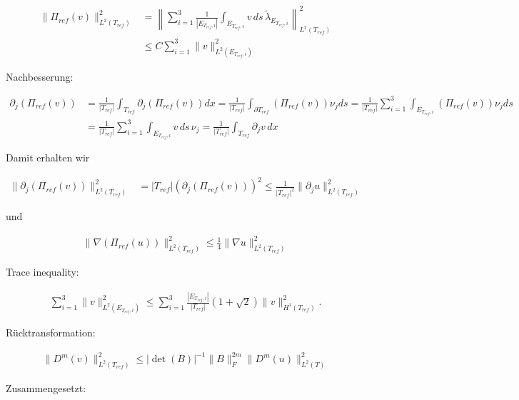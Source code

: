\begin{solution}
\begin{enumerate}[label = \textbf{\alph*)}]
  \begin{align*}
    \|\Pi_{ref}(v)\|_{L^2(T_{ref})}^2 &=
    \left\|\sum_{i=1}^{3} \frac{1}{|E_{T_{ref},i}|}\int_{E_{T_{ref},i}} v\, ds\,
    \tilde{\lambda}_{E_{T_{ref},i}} \right\|_{L^2(T_{ref})}^2 \\
    &\leq C \sum_{i=1}^{3}\|v\|_{L^2(E_{T_{ref},i})}^2
  \end{align*}

  Nachbesserung:

  \begin{align*}
    \partial_j (\Pi_{ref}(v)) &= \frac{1}{|T_{ref}|}\int_{T_{ref}} \partial_j (\Pi_{ref}(v)) dx
    = \frac{1}{|T_{ref}|}\int_{\partial T_{ref}} (\Pi_{ref}(v)) \nu_j ds
    = \frac{1}{|T_{ref}|}\sum_{i=1}^3\int_{E_{T_{ref},i}} (\Pi_{ref}(v)) \nu_j ds \\
    &= \frac{1}{|T_{ref}|}\sum_{i=1}^3\int_{E_{T_{ref},i}} v\, ds\, \nu_j
    = \frac{1}{|T_{ref}|}\int_{T_{ref}} \partial_j v\, dx
  \end{align*}

  Damit erhalten wir

  \begin{align*}
    \|\partial_j (\Pi_{ref}(v))\|_{L^2(T_{ref})}^2 &= |T_{ref}| (\partial_j (\Pi_{ref}(v)))^2
    \leq \frac{1}{|T_{ref}|^2} \|\partial_j u\|_{L^2(T_{ref})}^2
  \end{align*}

  und

  \begin{align*}
    \|\nabla(\Pi_{ref}(u))\|_{L^2(T_{ref})}^2 \leq \frac{1}{4} \|\nabla u\|_{L^2(T_{ref})}^2
  \end{align*}

Trace inequality:

\begin{align*}
  \sum_{i=1}^{3}\|v\|_{L^2(E_{T_{ref},i})}^2 \leq \sum_{i=1}^{3}\frac{|E_{T_{ref},i}|}{|T_{ref}|}
  \left(1 + \sqrt{2}\right)\|v\|_{H^1(T_{ref})}^2.
\end{align*}

Rücktransformation:

\begin{align*}
  \|D^m(v)\|_{L^2(T_{ref})}^2 \leq |\det(B)|^{-1}\|B\|_F^{2m}\|D^m(u)\|_{L^2(T)}^2
\end{align*}

Zusammengesetzt:


\end{enumerate}
\end{solution}
